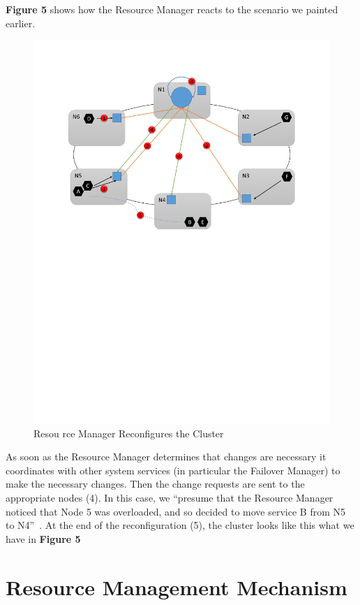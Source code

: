 {\bf Figure 5} shows how the Resource Manager reacts to the scenario we
painted earlier.

\begin{figure}[!ht]
  \centering\includegraphics[width=\columnwidth]{images/fig5.pdf}
  \caption{Resou
rce Manager Reconfigures the Cluster~\cite{hid-sp18-501-fig2and3}}
\label{f:architecture}
\end{figure}

As soon as the Resource Manager determines that changes are necessary
it coordinates with other system services (in particular the Failover
Manager) to make the necessary changes. Then the change requests are
sent to the appropriate nodes (4). In this case, we ``presume that the
Resource Manager noticed that Node 5 was overloaded, and so decided to
move service B from N5 to N4''~\cite{hid-sp18-501-fig2and3}. 
At the end of the reconfiguration (5),
the cluster looks like this what we have in {\bf Figure 5}

\section{Resource Management Mechanism}

